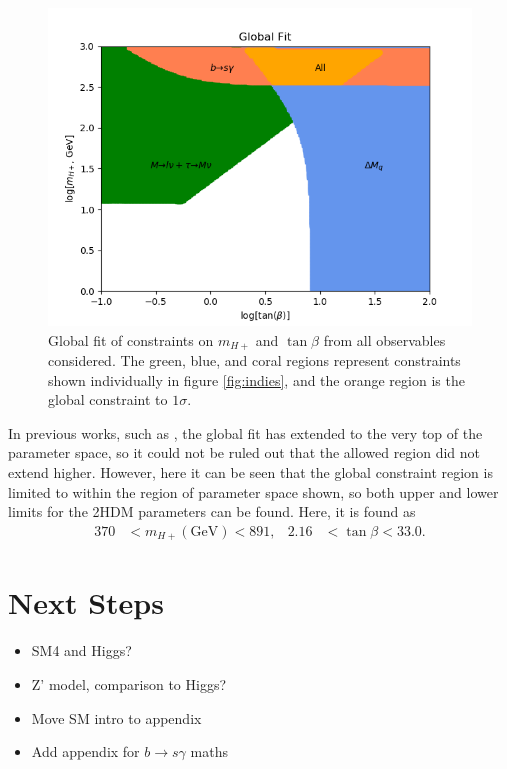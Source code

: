 \documentclass[a4paper,12pt]{article}
\begin{document}
\begin{figure}[ht]
    \vspace{-20pt}
    \centering
    \includegraphics[scale=0.55]{../calcs/global.png}
    \caption{\label{fig:glob} Global fit of constraints on $m_{H+}$ and $\tan\beta$ from all observables considered. The green, blue, and coral regions represent constraints shown individually in figure \ref{fig:indies}, and the orange region is the global constraint to $1\sigma$.}
\end{figure}
In previous works, such as \cite{a}, the global fit has extended to the very top of the parameter space, so it could not be ruled out that the allowed region did not extend higher. 
However, here it can be seen that the global constraint region is limited to within the region of parameter space shown, so both upper and lower limits for the 2HDM parameters can be found.
Here, it is found as
\begin{align}
    \label{eq:const}
    370 &< m_{H+} (\text{GeV}) < 891, & 2.16 &< \tan\beta < 33.0.
\end{align}

\section{Next Steps}
\begin{multicols}{2}
\begin{itemize}
    \item SM4 and Higgs?
    \item Z' model, comparison to Higgs?
    \item Move SM intro to appendix
    \item Add appendix for $b\to s\gamma$ maths
\end{itemize}
\end{multicols}
\end{document}
